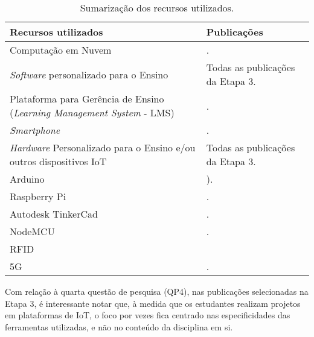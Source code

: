 \documentclass[portuguese]{textolivre}
\begin{document}
\begin{table}[h!]
\centering \small
\begin{threeparttable}
\caption{Sumarização dos recursos utilizados.}
\label{tab02}
\begin{tabular}{p{5cm} p{8.9cm}}
\toprule
Recursos utilizados & Publicações \\
 \midrule
Computação em Nuvem & \textcite{memos_revolutionary_2020,lin_construction_2019,fortoul-diaz_project-based_2021,nai_design_2022,liu_internet_2021,li_improved_2020,tan_teaching_2018,burunkaya_design_2022,liu_construction_2021}. \\
\textit{Software} personalizado para o Ensino & Todas as publicações da Etapa 3. \\
Plataforma para Gerência de Ensino (\textit{Learning Management System} - LMS) & \textcite{memos_revolutionary_2020,mahmood_raspberry_2019,fortoul-diaz_project-based_2021,nai_design_2022,petrovic_designing_2021,liu_internet_2021,hincapie_use_2020}. \\
\textit{Smartphone} & \textcite{mohammed_powerful_2021,chang_learning_2020,lin_iot_2020,shan_smart_2020,oteri_application_2020,debauche_internet_2018,petrovic_designing_2021,tan_teaching_2018,saraubon_learning_2019}. \\
\textit{Hardware} Personalizado para o Ensino e/ou outros dispositivos IoT & Todas as publicações da Etapa 3. \\
Arduino & \textcite{oteri_application_2020,petrovic_designing_2021}). \\
Raspberry Pi & \textcite{saraubon_learning_2019,mahmood_raspberry_2019,debauche_internet_2018}. \\
Autodesk TinkerCad & \textcite{oteri_application_2020}. \\
NodeMCU & \textcite{mohammed_powerful_2021,fortoul-diaz_project-based_2021,li_improved_2020,tan_teaching_2018}. \\
RFID & \textcite{lin_iot_2020,petrovic_designing_2021,tan_teaching_2018} \\
5G & \textcite{memos_revolutionary_2020,lin_construction_2019}. \\
\bottomrule
\end{tabular}
\end{threeparttable}
\end{table}

Com relação à quarta questão de pesquisa (QP4), nas publicações selecionadas na Etapa 3, é interessante notar que, à medida que os estudantes realizam projetos em plataformas de IoT, o foco por vezes fica centrado nas especificidades das ferramentas utilizadas, e não no conteúdo da disciplina em si. 
\end{document}
